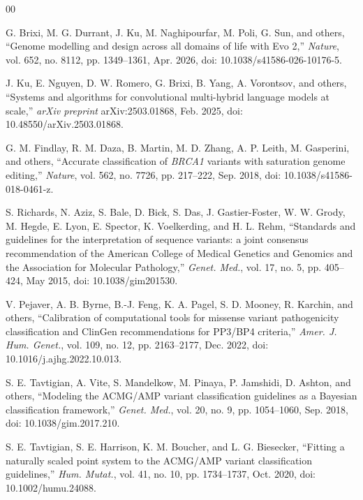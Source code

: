 \documentclass[10pt,journal]{IEEEtran}
\begin{document}
\begin{thebibliography}{00}

 G. Brixi, M. G. Durrant, J. Ku, M. Naghipourfar, M. Poli, G. Sun, and others, ``Genome modelling and design across all domains of life with Evo 2,'' \textit{Nature}, vol. 652, no. 8112, pp. 1349--1361, Apr. 2026, doi: 10.1038/s41586-026-10176-5.

 J. Ku, E. Nguyen, D. W. Romero, G. Brixi, B. Yang, A. Vorontsov, and others, ``Systems and algorithms for convolutional multi-hybrid language models at scale,'' \textit{arXiv preprint} arXiv:2503.01868, Feb. 2025, doi: 10.48550/arXiv.2503.01868.

 G. M. Findlay, R. M. Daza, B. Martin, M. D. Zhang, A. P. Leith, M. Gasperini, and others, ``Accurate classification of \emph{BRCA1} variants with saturation genome editing,'' \textit{Nature}, vol. 562, no. 7726, pp. 217--222, Sep. 2018, doi: 10.1038/s41586-018-0461-z.

 S. Richards, N. Aziz, S. Bale, D. Bick, S. Das, J. Gastier-Foster, W. W. Grody, M. Hegde, E. Lyon, E. Spector, K. Voelkerding, and H. L. Rehm, ``Standards and guidelines for the interpretation of sequence variants: a joint consensus recommendation of the American College of Medical Genetics and Genomics and the Association for Molecular Pathology,'' \textit{Genet. Med.}, vol. 17, no. 5, pp. 405--424, May 2015, doi: 10.1038/gim201530.

 V. Pejaver, A. B. Byrne, B.-J. Feng, K. A. Pagel, S. D. Mooney, R. Karchin, and others, ``Calibration of computational tools for missense variant pathogenicity classification and ClinGen recommendations for PP3/BP4 criteria,'' \textit{Amer. J. Hum. Genet.}, vol. 109, no. 12, pp. 2163--2177, Dec. 2022, doi: 10.1016/j.ajhg.2022.10.013.

 S. E. Tavtigian, A. Vite, S. Mandelkow, M. Pinaya, P. Jamshidi, D. Ashton, and others, ``Modeling the ACMG/AMP variant classification guidelines as a Bayesian classification framework,'' \textit{Genet. Med.}, vol. 20, no. 9, pp. 1054--1060, Sep. 2018, doi: 10.1038/gim.2017.210.

 S. E. Tavtigian, S. E. Harrison, K. M. Boucher, and L. G. Biesecker, ``Fitting a naturally scaled point system to the ACMG/AMP variant classification guidelines,'' \textit{Hum. Mutat.}, vol. 41, no. 10, pp. 1734--1737, Oct. 2020, doi: 10.1002/humu.24088.


\end{thebibliography}
\end{document}
